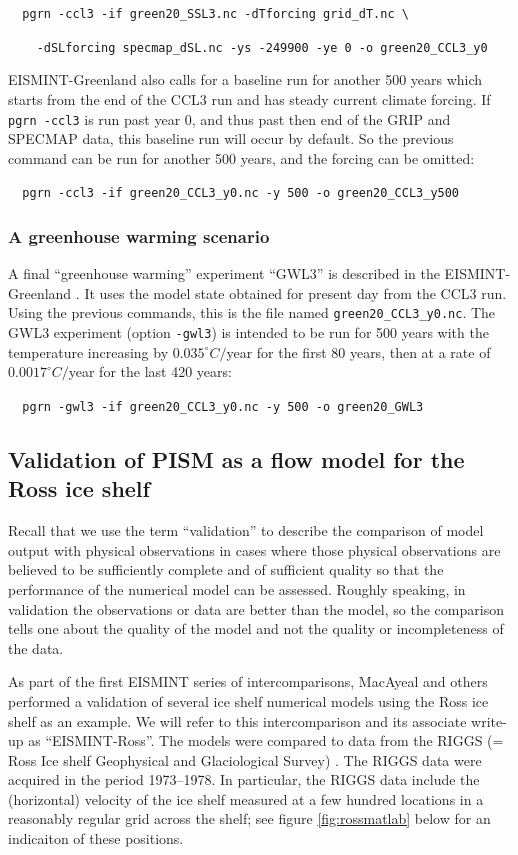\documentclass[11pt,final]{amsart}
\begin{document}
\verb|  pgrn -ccl3 -if green20_SSL3.nc -dTforcing grid_dT.nc \|

\verb|    -dSLforcing specmap_dSL.nc -ys -249900 -ye 0 -o green20_CCL3_y0|

\noindent EISMINT-Greenland also calls for a baseline run for another 500 years which starts from the end of the CCL3 run and has steady current climate forcing.  If \verb|pgrn -ccl3| is run past year 0, and thus past then end of the GRIP and SPECMAP data, this baseline run will occur by default.  So the previous command can be run for another 500 years, and the forcing can be omitted:

\verb|  pgrn -ccl3 -if green20_CCL3_y0.nc -y 500 -o green20_CCL3_y500|

\subsubsection{A greenhouse warming scenario}  A final ``greenhouse warming'' experiment ``GWL3'' is described in the EISMINT-Greenland \cite{RitzEISMINT}.  It uses the model state obtained for present day from the CCL3 run.  Using the previous commands, this is the file named \verb|green20_CCL3_y0.nc|.  The GWL3 experiment (option \verb|-gwl3|) is intended to be run for 500 years with the temperature increasing by $0.035^\circ C/$year for the first 80 years, then at a rate of $0.0017^\circ C/$year for the last 420 years:

\verb|  pgrn -gwl3 -if green20_CCL3_y0.nc -y 500 -o green20_GWL3|


\subsection{Validation of PISM as a flow model for the Ross ice shelf}\label{subsect:ross}  Recall that we use the term ``validation'' to describe the comparison of model output with physical observations in cases where those physical observations are believed to be sufficiently complete and of sufficient quality so that the performance of the numerical model can be assessed.  Roughly speaking, in validation the observations or data are better than the model, so the comparison tells one about the quality of the model and not the quality or incompleteness of the data.

As part of the first EISMINT series of intercomparisons, MacAyeal and others \cite{MacAyealetal} performed a validation of several ice shelf numerical models using the Ross ice shelf as an example.  We will refer to this intercomparison and its associate write-up \cite{MacAyealetal} as ``EISMINT-Ross''.  The models were compared to data from the RIGGS (= Ross Ice shelf Geophysical and Glaciological Survey) \cite{RIGGS1,RIGGS2}.  The RIGGS data were acquired in the period 1973--1978.   In particular, the RIGGS data include the (horizontal) velocity of the ice shelf measured at a few hundred locations in a reasonably regular grid across the shelf; see figure \ref{fig:rossmatlab} below for an indicaiton of these positions.
\end{document}
